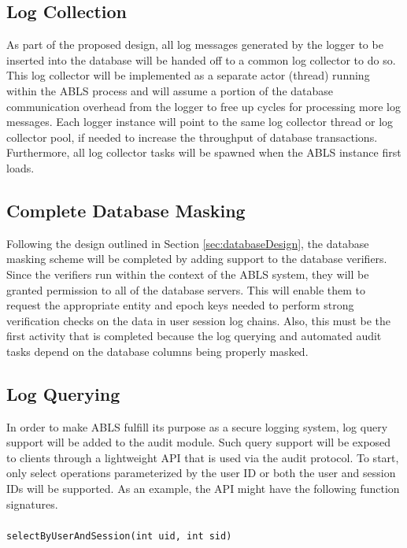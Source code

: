\documentclass{sig-alternate}
\begin{document}
\subsection{Log Collection}
As part of the proposed design, all log messages generated by the logger to be inserted into the 
database will be handed off to a common log collector to do so. This log collector will be implemented as a 
separate actor (thread) running within the ABLS process and will assume a portion of the database 
communication overhead from the logger to free up cycles for processing more log messages. Each logger instance
will point to the same log collector thread or log collector pool, if needed to increase the throughput of database 
transactions. Furthermore, all log collector tasks will be spawned when the ABLS instance first loads.

\subsection{Complete Database Masking}
Following the design outlined in Section \ref{sec:databaseDesign}, the database masking scheme will be completed by
adding support to the database verifiers. Since the verifiers run within the context of the ABLS system, they will be granted
permission to all of the database servers. This will enable them to request the appropriate entity and epoch keys 
needed to perform strong verification checks on the data in user session log chains. Also, this must be the first 
activity that is completed because the log querying and automated audit tasks depend on the database columns 
being properly masked. 

\subsection{Log Querying}
\label{sec:querying}
In order to make ABLS fulfill its purpose as a secure logging system, log query support will be added to the audit
module. Such query support will be exposed to clients through a lightweight API that is used via the audit protocol.
To start, only select operations parameterized by the user ID or both the user and session IDs will be supported. 
As an example, the API might have the following function signatures. \\

 \\
{\tt selectByUserAndSession(int uid, int sid)}\\
\end{document}
